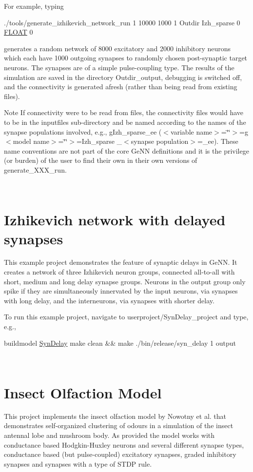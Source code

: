 For example, typing 
\begin{DoxyCode}
./tools/generate\_izhikevich\_network\_run 1 10000 1000 1 Outdir Izh\_sparse 0 \hyperlink{modelSpec_8h_ae8690abbffa85934d64d545920e2b108}{FLOAT} 0 
\end{DoxyCode}
 generates a random network of 8000 excitatory and 2000 inhibitory neurons which each have 1000 outgoing synapses to randomly chosen post-\/synaptic target neurons. The synapses are of a simple pulse-\/coupling type. The results of the simulation are saved in the directory {\ttfamily Outdir\+\_\+output}, debugging is switched off, and the connectivity is generated afresh (rather than being read from existing files). \begin{DoxyNote}{Note}
If connectivity were to be read from files, the connectivity files would have to be in the {\ttfamily inputfiles} sub-\/directory and be named according to the names of the synapse populations involved, e.\+g., {\ttfamily g\+Izh\+\_\+sparse\+\_\+ee} ($<$variable name$>$=\char`\"{}\char`\"{}$>$={\ttfamily g} $<$model name$>$=\char`\"{}\char`\"{}$>$={\ttfamily Izh\+\_\+sparse} \+\_\+$<$synapse population$>$={\ttfamily \+\_\+ee}). These name conventions are not part of the core Ge\+N\+N definitions and it is the privilege (or burden) of the user to find their own in their own versions of {\ttfamily generate\+\_\+\+X\+X\+X\+\_\+run}.
\end{DoxyNote}
~\newline
\hypertarget{Examples_ex_izhdelay}{}\section{Izhikevich network with delayed synapses}\label{Examples_ex_izhdelay}
This example project demonstrates the feature of synaptic delays in Ge\+N\+N. It creates a network of three Izhikevich neuron groups, connected all-\/to-\/all with short, medium and long delay synapse groups. Neurons in the output group only spike if they are simultaneously innervated by the input neurons, via synapses with long delay, and the interneurons, via synapses with shorter delay.

To run this example project, navigate to {\ttfamily userproject/\+Syn\+Delay\+\_\+project} and type, e.\+g., 
\begin{DoxyCode}
buildmodel \hyperlink{classSynDelay}{SynDelay}
make clean && make 
./bin/release/syn\_delay 1 output
\end{DoxyCode}


~\newline
\hypertarget{Examples_ex_mbody}{}\section{Insect Olfaction Model}\label{Examples_ex_mbody}
This project implements the insect olfaction model by Nowotny et al. \cite{nowotny2005self} that demonstrates self-\/organized clustering of odours in a simulation of the insect antennal lobe and mushroom body. As provided the model works with conductance based Hodgkin-\/\+Huxley neurons \cite{Traub1991} and several different synapse types, conductance based (but pulse-\/coupled) excitatory synapses, graded inhibitory synapses and synapses with a type of S\+T\+D\+P rule.

